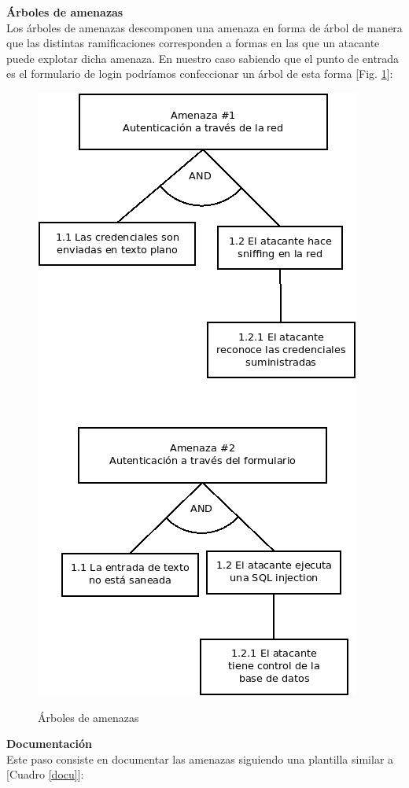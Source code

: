 \documentclass[a4paper,oneside]{article}
\begin{document}
\textbf{Árboles de amenazas}\\
Los árboles de amenazas descomponen una amenaza en forma de árbol de manera que las distintas ramificaciones corresponden a formas en las que un atacante puede explotar dicha amenaza. En nuestro caso sabiendo que el punto de entrada es el formulario de login podríamos confeccionar un árbol de esta forma [Fig. \ref{fig:tree}]:

\begin{figure}[h!]
  \centering
  \includegraphics[scale=0.6]{images/tree.png}\\
  \caption{Árboles de amenazas}
  \label{fig:tree}
\end{figure}

\textbf{Documentación}\\
Este paso consiste en documentar las amenazas siguiendo una plantilla similar a [Cuadro \ref{docu}]:
\end{document}
